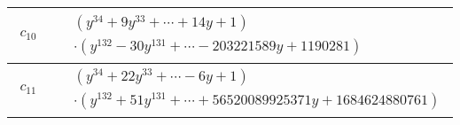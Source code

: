 \documentclass[1p]{elsarticle_modified}
\theoremstyle{definition}
\begin{document}
\begin{tabular}{m{50pt}|m{274pt}}
\hline $$\begin{aligned}c_{10}\end{aligned}$$&$\begin{aligned}
&(y^{34}+9 y^{33}+\cdots+14 y+1)\\
&\cdot(y^{132}-30 y^{131}+\cdots-203221589 y+1190281)
\end{aligned}$\\
\hline $$\begin{aligned}c_{11}\end{aligned}$$&$\begin{aligned}
&(y^{34}+22 y^{33}+\cdots-6 y+1)\\
&\cdot(y^{132}+51 y^{131}+\cdots+56520089925371 y+1684624880761)
\end{aligned}$\\
\hline
\end{tabular}
\vskip 2pc
\end{document}
